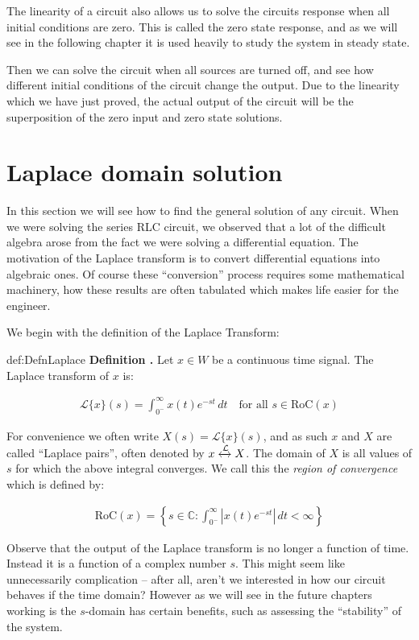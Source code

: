 \documentclass[14pt,a5paper,twoside]{book}
\newenvironment{myDefinition}[2]{ \begin{Definition}[adjusted title=#1]{}{#2} 
  \textbf{Definition \thetcbcounter.} \label{#2}}{\end{Definition}}
\begin{document}
The linearity of a circuit also allows us to solve the circuits response when all initial conditions are zero. This is called the zero state response, and as we will see in the following chapter it is used heavily to study the system in steady state.

Then we can solve the circuit when all sources are turned off, and see how different initial conditions of the circuit change the output. Due to the linearity which we have just proved, the actual output of the circuit will be the superposition of the zero input and zero state solutions.

\newpage
\section{Laplace domain solution}
In this section we will see how to find the general solution of any circuit. When we were solving the series RLC circuit, we observed that a lot of the difficult algebra arose from the fact we were solving a differential equation. The motivation of the Laplace transform is to convert differential equations into algebraic ones. Of course these ``conversion'' process requires some mathematical machinery, how these results are often tabulated which makes life easier for the engineer.

We begin with the definition of the Laplace Transform:

\begin{myDefinition}{Laplace Transform}{def:DefnLaplace}
	Let $x\in W$ be a continuous time signal. The Laplace transform of $x$ is:
	
	\begin{align*}
	\mathcal{L}\{x\}(s) = \int_{0^-}^{\infty} x(t) e^{-st}\, dt \quad\text{for all } s\in\mathrm{RoC}(x)
	\end{align*}

	For convenience we often write $X(s) =  \mathcal{L}\{x\}(s)$, and as such $x$ and $X$ are called ``Laplace pairs'', often denoted by $x \xleftrightarrow{\mathcal{L}} X$.
	\bigbreak
	The domain of $X$ is all values of $s$ for which the above integral converges. We call this the \emph{region of convergence} which is defined by:
	
	\begin{align*}
	\mathrm{RoC}(x) = \left\{s\in\mathbb{C}: \int_{0^-}^{\infty} |x(t) e^{-st}|\, dt < \infty\right\}
	\end{align*}
\end{myDefinition}


Observe that the output of the Laplace transform is no longer a function of time. Instead it is a function of a complex number $s$. This might seem like unnecessarily complication -- after all, aren't we interested in how our circuit behaves if the time domain? However as we will see in the future chapters working is the $s$-domain has certain benefits, such as assessing the ``stability'' of the system.
\end{document}
